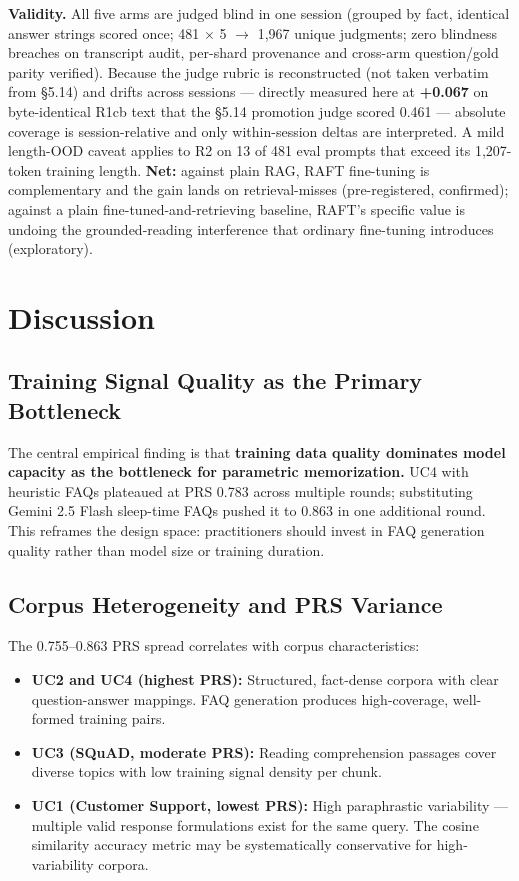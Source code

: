 \documentclass[10pt,twocolumn]{article}
\begin{document}
\textbf{Validity.} All five arms are judged blind in one session (grouped by fact, identical answer strings scored once; 481 $\times$ 5 $\to$ 1,967 unique judgments; zero blindness breaches on transcript audit, per-shard provenance and cross-arm question/gold parity verified). Because the judge rubric is reconstructed (not taken verbatim from \S{}5.14) and drifts across sessions --- directly measured here at \textbf{+0.067} on byte-identical R1cb text that the \S{}5.14 promotion judge scored 0.461 --- absolute coverage is session-relative and only within-session deltas are interpreted. A mild length-OOD caveat applies to R2 on 13 of 481 eval prompts that exceed its 1,207-token training length. \textbf{Net:} against plain RAG, RAFT fine-tuning is complementary and the gain lands on retrieval-misses (pre-registered, confirmed); against a plain fine-tuned-and-retrieving baseline, RAFT's specific value is undoing the grounded-reading interference that ordinary fine-tuning introduces (exploratory).



\smallskip

\section{Discussion}

\subsection{Training Signal Quality as the Primary Bottleneck}

The central empirical finding is that \textbf{training data quality dominates model capacity as the bottleneck for parametric memorization.} UC4 with heuristic FAQs plateaued at PRS 0.783 across multiple rounds; substituting Gemini 2.5 Flash sleep-time FAQs pushed it to 0.863 in one additional round. This reframes the design space: practitioners should invest in FAQ generation quality rather than model size or training duration.


\subsection{Corpus Heterogeneity and PRS Variance}

The 0.755--0.863 PRS spread correlates with corpus characteristics:


\begin{itemize}
  \item \textbf{UC2 and UC4 (highest PRS):} Structured, fact-dense corpora with clear question-answer mappings. FAQ generation produces high-coverage, well-formed training pairs.
  \item \textbf{UC3 (SQuAD, moderate PRS):} Reading comprehension passages cover diverse topics with low training signal density per chunk.
  \item \textbf{UC1 (Customer Support, lowest PRS):} High paraphrastic variability --- multiple valid response formulations exist for the same query. The cosine similarity accuracy metric may be systematically conservative for high-variability corpora.
\end{itemize}
\end{document}
